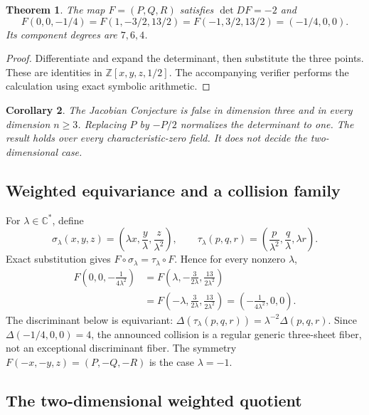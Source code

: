 \documentclass[11pt]{article}
\newtheorem{theorem}{Theorem}[section]
\newtheorem{corollary}[theorem]{Corollary}
\theoremstyle{remark}
\newcommand{\C}{\mathbb C}
\begin{document}
\begin{theorem}\label{thm:core}
The map $F=(P,Q,R)$ satisfies $\det DF=-2$ and
\[
F(0,0,-1/4)=F(1,-3/2,13/2)=F(-1,3/2,13/2)=(-1/4,0,0).
\]
Its component degrees are $7,6,4$.
\end{theorem}

\begin{proof}
Differentiate and expand the determinant, then substitute the three points.
These are identities in $\mathbb Z[x,y,z,1/2]$. The accompanying verifier
performs the calculation using exact symbolic arithmetic.
\end{proof}

\begin{corollary}
The Jacobian Conjecture is false in dimension three and in every dimension
$n\geq3$. Replacing $P$ by $-P/2$ normalizes the determinant to one.
The result holds over every characteristic-zero field. It does not decide the
two-dimensional case.
\end{corollary}

\subsection{Weighted equivariance and a collision family}

For $\lambda\in\C^*$, define
\[
\sigma_\lambda(x,y,z)=\left(\lambda x,\frac y\lambda,
\frac z{\lambda^2}\right),\qquad
\tau_\lambda(p,q,r)=\left(\frac p{\lambda^2},\frac q\lambda,
\lambda r\right).
\]
Exact substitution gives $F\circ\sigma_\lambda=\tau_\lambda\circ F$. Hence
for every nonzero $\lambda$,
\begin{align*}
F\left(0,0,-\frac1{4\lambda^2}\right)
&=F\left(\lambda,-\frac3{2\lambda},\frac{13}{2\lambda^2}\right)\\
&=F\left(-\lambda,\frac3{2\lambda},\frac{13}{2\lambda^2}\right)
=\left(-\frac1{4\lambda^2},0,0\right).
\end{align*}
The discriminant below is equivariant:
$\Delta(\tau_\lambda(p,q,r))=\lambda^{-2}\Delta(p,q,r)$. Since
$\Delta(-1/4,0,0)=4$, the announced collision is a regular generic
three-sheet fiber, not an exceptional discriminant fiber. The symmetry
$F(-x,-y,z)=(P,-Q,-R)$ is the case $\lambda=-1$.

\subsection{The two-dimensional weighted quotient}
\end{document}
